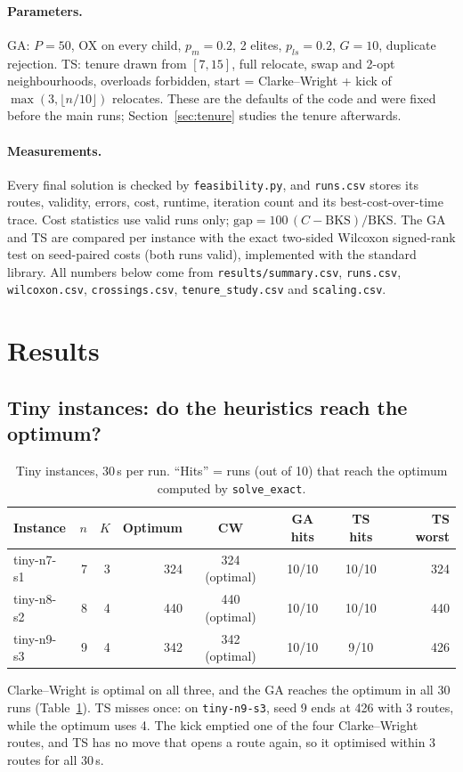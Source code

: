 \documentclass[11pt,a4paper]{article}
\theoremstyle{definition}
\theoremstyle{remark}
\newcommand{\code}[1]{\texttt{#1}}
\begin{document}
\paragraph{Parameters.} GA: $P=50$, OX on every child, $p_m=0.2$, 2 elites, $p_{ls}=0.2$,
$G=10$, duplicate rejection. TS: tenure drawn from $[7,15]$, full relocate, swap and 2-opt
neighbourhoods, overloads forbidden, start = Clarke--Wright + kick of
$\max(3,\lfloor n/10\rfloor)$ relocates. These are the defaults of the code and were fixed
before the main runs; Section~\ref{sec:tenure} studies the tenure afterwards.

\paragraph{Measurements.} Every final solution is checked by \code{feasibility.py}, and
\code{runs.csv} stores its routes, validity, errors, cost, runtime, iteration count and its
best-cost-over-time trace. Cost statistics use valid runs only;
$\text{gap}=100\,(C-\text{BKS})/\text{BKS}$. The GA and TS are compared per instance with the
exact two-sided Wilcoxon signed-rank test on seed-paired costs (both runs valid),
implemented with the standard library. All numbers below come from
\code{results/summary.csv}, \code{runs.csv}, \code{wilcoxon.csv}, \code{crossings.csv},
\code{tenure\_study.csv} and \code{scaling.csv}.

\section{Results}\label{sec:results}

\subsection{Tiny instances: do the heuristics reach the optimum?}
\begin{table}[ht]
\centering
\caption{Tiny instances, 30\,s per run. ``Hits'' = runs (out of 10) that reach the optimum
computed by \code{solve\_exact}.}
\label{tab:tiny}
\begin{tabular}{lrrrcccr}
\toprule
Instance & $n$ & $K$ & Optimum & CW & GA hits & TS hits & TS worst\\
\midrule
tiny-n7-s1 & 7 & 3 & 324 & 324 (optimal) & 10/10 & 10/10 & 324\\
tiny-n8-s2 & 8 & 4 & 440 & 440 (optimal) & 10/10 & 10/10 & 440\\
tiny-n9-s3 & 9 & 4 & 342 & 342 (optimal) & 10/10 & 9/10  & 426\\
\bottomrule
\end{tabular}
\end{table}
Clarke--Wright is optimal on all three, and the GA reaches the optimum in all 30 runs
(Table~\ref{tab:tiny}). TS misses once: on \code{tiny-n9-s3}, seed 9 ends at 426 with 3
routes, while the optimum uses 4. The kick emptied one of the four Clarke--Wright routes,
and TS has no move that opens a route again, so it optimised within 3 routes for all 30\,s.
\end{document}
